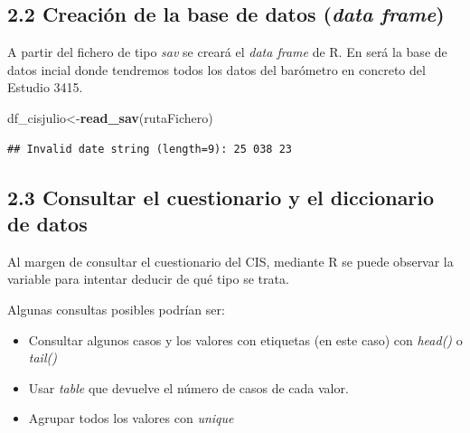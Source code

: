 \documentclass[
]{article}
\newenvironment{Shaded}{\begin{snugshade}}{\end{snugshade}}
\newcommand{\CommentTok}[1]{\textcolor[rgb]{0.56,0.35,0.01}{\textit{#1}}}
\newcommand{\DecValTok}[1]{\textcolor[rgb]{0.00,0.00,0.81}{#1}}
\newcommand{\FunctionTok}[1]{\textcolor[rgb]{0.13,0.29,0.53}{\textbf{#1}}}
\newcommand{\NormalTok}[1]{#1}
\newcommand{\OtherTok}[1]{\textcolor[rgb]{0.56,0.35,0.01}{#1}}
\newcommand{\SpecialCharTok}[1]{\textcolor[rgb]{0.81,0.36,0.00}{\textbf{#1}}}
\providecommand{\tightlist}{%
  \setlength{\itemsep}{0pt}\setlength{\parskip}{0pt}}
\begin{document}
\hypertarget{creaciuxf3n-de-la-base-de-datos-data-frame}{%
\subsection{\texorpdfstring{2.2 Creación de la base de datos (\emph{data
frame})}{2.2 Creación de la base de datos (data frame)}}\label{creaciuxf3n-de-la-base-de-datos-data-frame}}

A partir del fichero de tipo \emph{sav} se creará el \emph{data frame}
de R. En será la base de datos incial donde tendremos todos los datos
del barómetro en concreto del Estudio 3415.

\begin{Shaded}
\begin{Highlighting}[]
\NormalTok{df\_cisjulio}\OtherTok{\textless{}{-}}\FunctionTok{read\_sav}\NormalTok{(rutaFichero)}
\end{Highlighting}
\end{Shaded}

\begin{verbatim}
## Invalid date string (length=9): 25 038 23
\end{verbatim}

\hypertarget{consultar-el-cuestionario-y-el-diccionario-de-datos}{%
\subsection{2.3 Consultar el cuestionario y el diccionario de
datos}\label{consultar-el-cuestionario-y-el-diccionario-de-datos}}

Al margen de consultar el cuestionario del CIS, mediante R se puede
observar la variable para intentar deducir de qué tipo se trata.

Algunas consultas posibles podrían ser:

\begin{itemize}
\tightlist
\item
  Consultar algunos casos y los valores con etiquetas (en este caso) con
  \emph{head()} o \emph{tail()}
\item
  Usar \emph{table} que devuelve el número de casos de cada valor.
\item
  Agrupar todos los valores con \emph{unique}
\end{itemize}

\begin{Shaded}
\end{Shaded}
\end{document}
